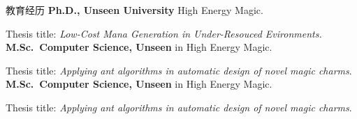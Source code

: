 \begin{rubric}{教育经历}
\entry*[2009 -- 2013]%
	\textbf{Ph.D., Unseen University} High Energy Magic.
	\par Thesis title: \emph{Low-Cost Mana Generation in Under-Resouced Evironments.}
%
\entry*[2003 -- 2006]%
	\textbf{M.Sc.~Computer Science, Unseen} in High Energy Magic.\par
	Thesis title: \emph{Applying ant algorithms in automatic design of novel magic charms}.
% 
\entry*[2003 -- 2006]%
	\textbf{M.Sc.~Computer Science, Unseen} in High Energy Magic.\par
	Thesis title: \emph{Applying ant algorithms in automatic design of novel magic charms}.
\end{rubric}